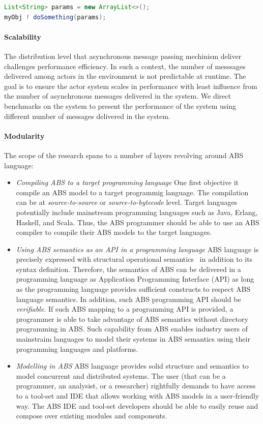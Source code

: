 \begin{lstlisting}[float=h,language=Java,caption=Using Java in ABS,label=lst:abs:java]
List<String> params = new ArrayList<>();
myObj ! doSomething(params);   
\end{lstlisting}

\paragraph{Scalability} 
The distribution level that asynchronous message passing mechinism deliver
challenges performance efficiency.
In such a context, the number of messsages delivered among actors in the 
environment is not predictable at runtime.
The goal is to ensure the actor system scales in performance with least 
influence from the number of asynchronous messages delivered in the system.
We direct benchmarks on the system to present the performance of the system
using different number of messages delivered in the system.

\paragraph{Modularity} 
The scope of the research spans to a number of layers revolving around ABS
 language:
\begin{itemize}
\item \emph{Compiling ABS to a target programming language}
One first objective it compile an ABS model to a target programmig language.
The compilation can be at \emph{source-to-source} or \emph{source-to-bytecode}
level.
Target languages potentially include mainstream programming languages such as
Java, Erlang, Haskell, and Scala.
Thus, the ABS programmer should be able to use an ABS compiler to compile
their ABS models to the target languages.
\item \emph{Using ABS semantics as an API in a programming language}
ABS language is precisely expressed with structural operational semantics~\cite{johnsen2012abs} in addition to its syntax definition.
Therefore, the semantics of ABS can be delivered in a programming language
as Application Programming Interface (API) as long as the programming language provides sufficient constructs to respect ABS language semantics.
In addition, such ABS programming API should be \emph{verifiable}.
If such ABS mapping to a programming API is provided, a programmer is able to
take advantage of ABS semantics without directory programming in ABS.
Such capability from ABS enables industry users of mainstraim languages to
model their systems in ABS semantics using their programming languages and
platforms.
\item \emph{Modelling in ABS}
ABS language provides solid structure and semantics to model concurrent
and distributed systems.
The user (that can be a programmer, an analysist, or a researcher) rightfully
demands to have access to a tool-set and IDE that allows working with ABS 
models in a user-friendly way.
The ABS IDE and tool-set developers should be able to easily reuse and compose
over existing modules and components.
\end{itemize}

